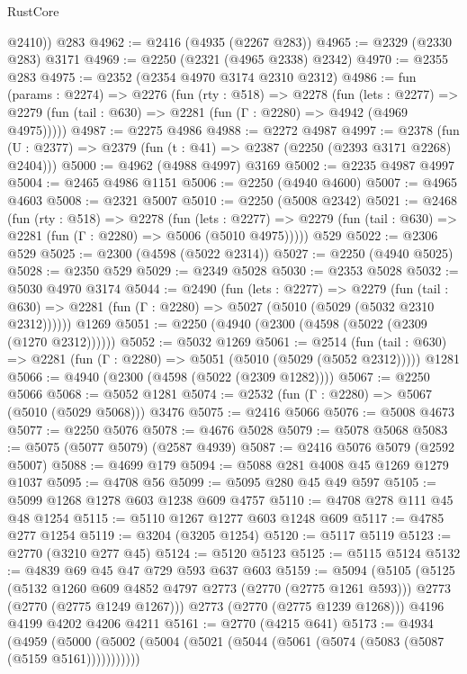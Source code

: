 \begin{lexlean}{RustCore}
\begin{coremodule}
        @2410))
    @283
@4962 := @2416 (@4935 (@2267 @283))
@4965 := @2329 (@2330 @283) @3171
@4969 := @2250 (@2321 (@4965 @2338) @2342)
@4970 := @2355 @283
@4975 := @2352 (@2354 @4970 @3174 @2310 @2312)
@4986 := fun (params : @2274) =>
  @2276
    (fun (rty : @518) =>
    @2278
      (fun (lets : @2277) =>
      @2279 (fun (tail : @630) => @2281 (fun (Γ : @2280) => @4942 (@4969 @4975)))))
@4987 := @2275 @4986
@4988 := @2272 @4987
@4997 := @2378 (fun (U : @2377) => @2379 (fun (t : @41) => @2387 (@2250 (@2393 @3171 @2268) @2404)))
@5000 := @4962 (@4988 @4997) @3169
@5002 := @2235 @4987 @4997
@5004 := @2465 @4986 @1151
@5006 := @2250 (@4940 @4600)
@5007 := @4965 @4603
@5008 := @2321 @5007
@5010 := @2250 (@5008 @2342)
@5021 := @2468
    (fun (rty : @518) =>
    @2278
      (fun (lets : @2277) =>
      @2279 (fun (tail : @630) => @2281 (fun (Γ : @2280) => @5006 (@5010 @4975)))))
    @529
@5022 := @2306 @529
@5025 := @2300 (@4598 (@5022 @2314))
@5027 := @2250 (@4940 @5025)
@5028 := @2350 @529
@5029 := @2349 @5028
@5030 := @2353 @5028
@5032 := @5030 @4970 @3174
@5044 := @2490
    (fun (lets : @2277) =>
    @2279
      (fun (tail : @630) => @2281 (fun (Γ : @2280) => @5027 (@5010 (@5029 (@5032 @2310 @2312))))))
    @1269
@5051 := @2250 (@4940 (@2300 (@4598 (@5022 (@2309 (@1270 @2312))))))
@5052 := @5032 @1269
@5061 := @2514
    (fun (tail : @630) => @2281 (fun (Γ : @2280) => @5051 (@5010 (@5029 (@5052 @2312)))))
    @1281
@5066 := @4940 (@2300 (@4598 (@5022 (@2309 @1282))))
@5067 := @2250 @5066
@5068 := @5052 @1281
@5074 := @2532 (fun (Γ : @2280) => @5067 (@5010 (@5029 @5068))) @3476
@5075 := @2416 @5066
@5076 := @5008 @4673
@5077 := @2250 @5076
@5078 := @4676 @5028
@5079 := @5078 @5068
@5083 := @5075 (@5077 @5079) (@2587 @4939)
@5087 := @2416 @5076 @5079 (@2592 @5007)
@5088 := @4699 @179
@5094 := @5088 @281 @4008 @45 @1269 @1279 @1037
@5095 := @4708 @56
@5099 := @5095 @280 @45 @49 @597
@5105 := @5099 @1268 @1278 @603 @1238 @609 @4757
@5110 := @4708 @278 @111 @45 @48 @1254
@5115 := @5110 @1267 @1277 @603 @1248 @609
@5117 := @4785 @277 @1254
@5119 := @3204 (@3205 @1254)
@5120 := @5117 @5119
@5123 := @2770 (@3210 @277 @45)
@5124 := @5120 @5123
@5125 := @5115 @5124
@5132 := @4839 @69 @45 @47 @729 @593 @637 @603
@5159 := @5094
    (@5105
      (@5125
        (@5132 @1260 @609 @4852 @4797 @2773 (@2770 (@2775 @1261 @593)))
        @2773
        (@2770 (@2775 @1249 @1267)))
      @2773
      (@2770 (@2775 @1239 @1268)))
    @4196
    @4199
    @4202
    @4206
    @4211
@5161 := @2770 (@4215 @641)
@5173 := @4934
    (@4959 (@5000 (@5002 (@5004 (@5021 (@5044 (@5061 (@5074 (@5083 (@5087 (@5159 @5161)))))))))))

\end{coremodule}
\end{lexlean}
